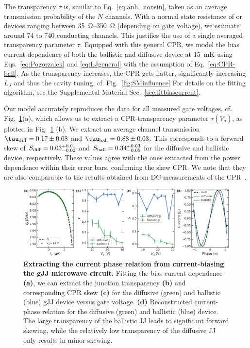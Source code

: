 The transparency $\tau$ is, similar to Eq.~\ref{eq:anh_nonsin}, taken as an average transmission probability of the $N$ channels.
%
With a normal state resistance of or devices ranging between \SIrange{35}{350}{\ohm} (depending on gate voltage), we estimate around 74 to 740 conducting channels.
%
This justifies the use of a single averaged transparency parameter $\tau$.
%
Equipped with this general CPR, we model the bias current dependence of both the ballistic and diffusive device at \SI{15}{\milli\kelvin} using Eqs.~\ref{eq:Pogorzalek} and \ref{eq:LJgeneral} with the assumption of Eq.~\ref{eq:CPR-ball}.
%
As the transparency increases, the CPR gets flatter, significantly increasing $L_J$ and thus the cavity tuning, cf. Fig.~\ref{fig:SMinfluence}
%
For details on the fitting algorithm, see the Supplemental Material Sec.~\ref{sec:fitbiascurrent}.


Our model accurately reproduces the data for all measured gate voltages, cf. Fig.~\ref{fig:figure5}(a), which allows us to extract a CPR-transparency parameter $\tau(V_g)$, as plotted in Fig.~\ref{fig:figure5}
(b).
%
We extract an average channel transmission $\tau_{\rm diff}=0.17\pm0.08$ and $\tau_{\rm ball}=0.88\pm0.03$.
%
This corresponds to a forward skew of $S_{\rm diff}=0.03_{-0.02}^{+0.01}$ and $S_{\rm ball}=0.34_{-0.05}^{+0.03}$ for the diffusive and ballistic device, respectively.
%
These values agree with the ones extracted from the power dependence within their error bars, confirming the skew CPR.
%
We note that they are also comparable to the results obtained from DC-measurements of the CPR~\cite{englishObservationNonsinusoidalCurrentphase2016,nandaCurrentPhaseRelationBallistic2017}.

\begin{figure}
	\centering
	\includegraphics[width=\linewidth]{chapter-gJJ-CPR/figs/Figure5}
	\caption{
		\textbf{Extracting the current phase relation from current-biasing the gJJ microwave circuit.}
		Fitting the bias current dependence \textbf{(a)}, we can extract the junction transparency \textbf{(b)} and corresponding CPR skew \textbf{(c)} for the diffusive (green) and ballistic (blue) gJJ device versus gate voltage.
		\textbf{(d)} Reconstructed current-phase relation for the diffusive (green) and ballistic (blue) device.
		The large transparency of the ballistic JJ leads to significant forward skewing, while the relatively low transparency of the diffusive JJ only results in minor skewing.
	}
	\label{fig:figure5}
\end{figure}

